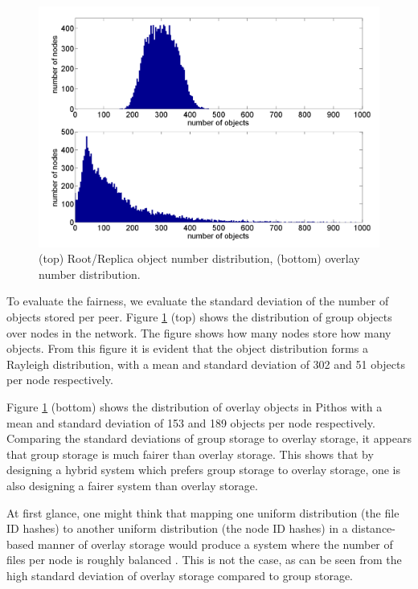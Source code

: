 \documentclass[10pt,a4paper,conference]{IEEEtran}
\begin{document}
\begin{figure}[htbp]
 \centering
 \includegraphics[clip=true, viewport=1cm 0.5cm 28.5cm 20cm, width=\columnwidth]{RootRepOverlayObjects}
 \caption{(top) Root/Replica object number distribution, (bottom) overlay number distribution.}
 \label{fig_group_overlay_objects}
\end{figure}
%
To evaluate the fairness, we evaluate the standard deviation of the number of objects stored per peer. Figure \ref{fig_group_overlay_objects} (top)
shows the distribution of group objects over nodes in the network. The figure shows how many nodes store how many objects. From this figure it is
evident that the object distribution forms a Rayleigh distribution, with a mean and standard deviation of 302 and 51 objects per node respectively.

Figure \ref{fig_group_overlay_objects} (bottom) shows the distribution of overlay objects in Pithos with a mean and standard deviation of 153 and 189
objects per node respectively. Comparing the standard deviations of group storage to overlay storage, it appears that group storage is much fairer
than overlay storage. This shows that by designing a hybrid system which prefers group storage to overlay storage, one is also designing a fairer
system than overlay storage.

At first glance, one might think that mapping one uniform distribution (the file ID hashes) to another uniform distribution (the node ID hashes) in a
distance-based manner of overlay storage would produce a system where the number of files per node is roughly balanced
\cite{storage_and_chaching_PAST}. This is not the case, as can be seen from the high standard deviation of overlay storage compared to group storage.
\end{document}
